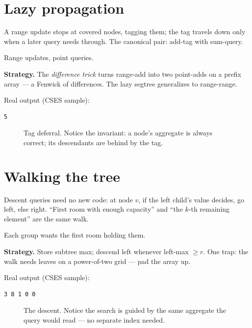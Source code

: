 \section{Lazy propagation}\label{sec:lazy}
A range update stops at covered nodes, tagging them; the tag
travels down only when a later query needs through. The canonical
pair: add-tag with sum-query.
\begin{example}\label{ex:ruq}
Range updates, point queries.
\par\smallskip
\textbf{Strategy.} The \emph{difference trick} turns range-add into
two point-adds on a prefix array --- a Fenwick of differences. The
lazy segtree generalizes to range-range.
\par\smallskip
\begin{solution}

Real output (CSES sample):
\begin{lstlisting}[numbers=none]
5
\end{lstlisting}
\end{solution}
\end{example}
\begin{figure}[ht]\centering

\caption{Tag deferral. Notice the invariant: a node's aggregate is
always correct; its descendants are behind by the tag.}
\label{fig:lazy}
\end{figure}

\section{Walking the tree}\label{sec:walk}
Descent queries need no new code: at node $v$, if the left child's
value decides, go left, else right. ``First room with enough
capacity'' and ``the $k$-th remaining element'' are the same walk.
\begin{example}\label{ex:hotel}
Each group wants the first room holding them.
\par\smallskip
\textbf{Strategy.} Store subtree max; descend left whenever
left-max $\ge r$. One trap: the walk needs leaves on a
power-of-two grid --- pad the array up.
\par\smallskip
\begin{solution}

Real output (CSES sample):
\begin{lstlisting}[numbers=none]
3 8 1 0 0 
\end{lstlisting}
\end{solution}
\end{example}
\begin{figure}[ht]\centering

\caption{The descent. Notice the search is guided by the same
aggregate the query would read --- no separate index needed.}
\label{fig:walk}
\end{figure}

